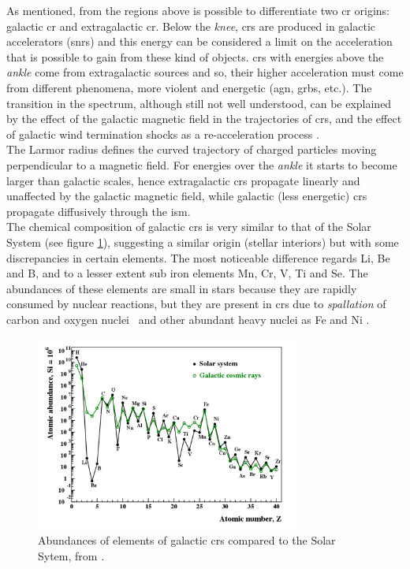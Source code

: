 \documentclass[main.tex]{subfiles}
\begin{document}
    
    As mentioned, from the regions above is possible to differentiate two \gls{cr} origins: galactic \gls{cr} and extragalactic \gls{cr}. Below the \textit{knee}, \glspl{cr} are produced in galactic accelerators (\glspl{snr}) and this energy can be considered a limit on the acceleration that is possible to gain from these kind of objects.
    \glspl{cr} with energies above the \textit{ankle} come from extragalactic sources and so, their higher acceleration must come from different phenomena, more violent and energetic (\gls{agn}, \glspl{grb}, etc.). The transition in the spectrum, although still not well understood, can be explained by the effect of the galactic magnetic field in the trajectories of \glspl{cr}, and the effect of galactic wind termination shocks as a re-acceleration process \cite{2016CRSpectrum}.\\
    The Larmor radius defines the curved trajectory of charged particles moving perpendicular to a magnetic field. For energies over the \textit{ankle} it starts to become larger than galactic scales, hence extragalactic \glspl{cr} propagate linearly and unaffected by the galactic magnetic field, while galactic (less energetic) \glspl{cr} propagate diffusively through the \gls{ism}.\\
    
    The chemical composition of galactic \glspl{cr} is very similar to that of the Solar System (see figure \ref{fig:CRabundances}), suggesting a similar origin (stellar interiors) but with some discrepancies in certain elements. The most noticeable difference regards Li, Be and B, and to a lesser extent sub iron elements Mn, Cr, V, Ti and Se. The abundances of these elements are small in stars because they are rapidly consumed by nuclear reactions, but they are present in \glspl{cr} due to \textit{spallation} of carbon and oxygen nuclei~\cite{particleastrophy} and other abundant heavy nuclei as Fe and Ni \cite{2018particleacceleration}.
    
    \begin{figure}
        \centering
        \includegraphics[width=0.77\textwidth]{Pictures/CRabundances.pdf}
        \caption{Abundances of elements of galactic \glspl{cr} compared to the Solar Sytem, from \cite{2018particleacceleration}.}
        \label{fig:CRabundances}
    \end{figure}
\end{document}
